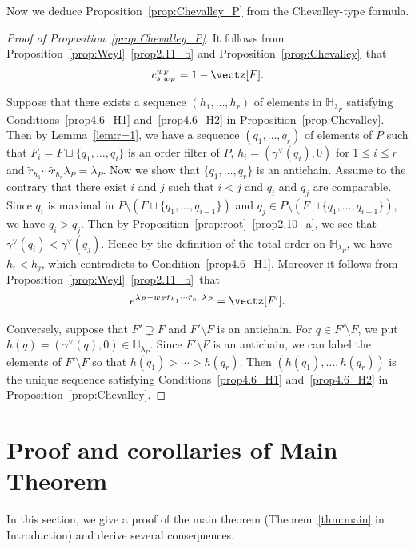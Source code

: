 Now we deduce Proposition~\ref{prop:Chevalley_P} from the Chevalley-type formula.

\begin{proof}[Proof of Proposition~\ref{prop:Chevalley_P}]
It follows from Proposition~\ref{prop:Weyl}~\ref{prop2.11_b}
and Proposition~\ref{prop:Chevalley}~that
$$
c^{w_F}_{s, w_F} = 1 - \vectz[F].
$$

Suppose that there exists a sequence $(h_1, \ldots, h_r)$ of elements in $\mathbb{H}_{\lambda_P}$ 
satisfying Conditions~\ref{prop4.6_H1} and~\ref{prop4.6_H2} in Proposition~\ref{prop:Chevalley}.
Then by Lemma~\ref{lem:r=1}, we have a sequence $(q_1, \ldots, q_r)$ of elements of $P$ such that 
$F_i = F \sqcup \{ q_1, \ldots, q_i \}$ is an order filter of $P$, $h_i = (\gamma^\vee(q_i),0)$ 
for $1 \le i \le r$ and $\tilde{r}_{h_1} \cdots \tilde{r}_{h_r} \lambda_P = \lambda_P$.
Now we show that $\{ q_1, \ldots, q_r \}$ is an antichain.
Assume to the contrary that there exist $i$ and $j$ such that $i<j$ and $q_i$ and $q_j$ are comparable.
Since $q_i$ is maximal in $P \setminus (F \sqcup \{ q_1, \ldots, q_{i-1} \})$ 
and $q_j \in P \setminus (F \sqcup \{ q_1, \ldots, q_{i-1} \})$, 
we have $q_i > q_j$.
Then by Proposition~\ref{prop:root}~\ref{prop2.10_a}, we see that $\gamma^\vee(q_i) < \gamma^\vee(q_j)$.
Hence by the definition of the total order on $\mathbb{H}_{\lambda_P}$, we have $h_i < h_j$,
which contradicts to Condition~\ref{prop4.6_H1}.
Moreover it follows from Proposition~\ref{prop:Weyl}~\ref{prop2.11_b}~that
$$
e^{\lambda_P - w_F \tilde{r}_{h_1} \cdots \tilde{r}_{h_r} \lambda_P}
 = \vectz[F'].
$$

Conversely, suppose that $F' \supsetneq F$ and $F' \setminus F$ is an antichain.
For $q \in F' \setminus F$, we put $h(q) = (\gamma^\vee(q),0) \in \mathbb{H}_{\lambda_P}$.
Since $F' \setminus F$ is an antichain, we can label the elements of $F' \setminus F$ 
so that $h(q_1) > \cdots > h(q_r)$.
Then $(h(q_1), \ldots, h(q_r))$ is the unique sequence satisfying Conditions~\ref{prop4.6_H1} and~\ref{prop4.6_H2} 
in Proposition~\ref{prop:Chevalley}.
\end{proof}


\section{%
Proof and corollaries of Main Theorem
}\label{sect5}

In this section, we give a proof of the main theorem (Theorem~\ref{thm:main} in Introduction) 
and derive several consequences.

